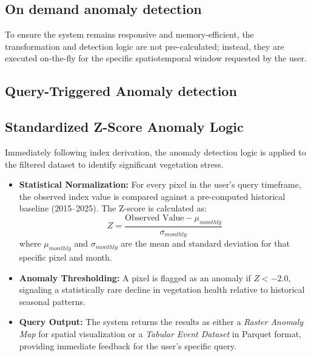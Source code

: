 \subsection{On demand anomaly detection}
\label{sec:on_demand_detection}

To ensure the system remains responsive and memory-efficient, the transformation and detection logic are not pre-calculated; instead, they are executed on-the-fly for the specific spatiotemporal window requested by the user.

\subsection{Query-Triggered Anomaly detection}
\label{subsec:on_demand_indices}
\subsection{Standardized Z-Score Anomaly Logic}
\label{subsec:z_score_logic}
Immediately following index derivation, the anomaly detection logic is applied to the filtered dataset to identify significant vegetation stress.

\begin{itemize}
    \item \textbf{Statistical Normalization:} For every pixel in the user's query timeframe, the observed index value is compared against a pre-computed historical baseline (2015--2025). The Z-score is calculated as:
    \begin{equation}
        Z = \frac{\text{Observed Value} - \mu_{monthly}}{\sigma_{monthly}}
    \end{equation}
    where $\mu_{monthly}$ and $\sigma_{monthly}$ are the mean and standard deviation for that specific pixel and month.
    \item \textbf{Anomaly Thresholding:} A pixel is flagged as an anomaly if $Z < -2.0$, signaling a statistically rare decline in vegetation health relative to historical seasonal patterns.
    \item \textbf{Query Output:} The system returns the results as either a \textit{Raster Anomaly Map} for spatial visualization or a \textit{Tabular Event Dataset} in Parquet format, providing immediate feedback for the user's specific query.
\end{itemize}